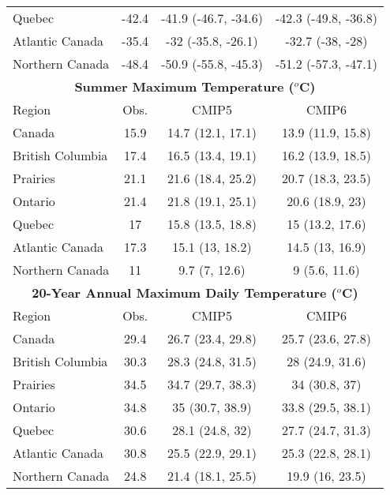 \documentclass[]{scrartcl}
\begin{document}
\begin{table}[t]
\begin{center}
\begin{tabular}{|l|ccc|}
			Quebec & -42.4 & -41.9 (-46.7, -34.6) & -42.3 (-49.8, -36.8) \\ 
			Atlantic Canada & -35.4 & -32 (-35.8, -26.1) & -32.7 (-38, -28) \\ 
			Northern Canada & -48.4 & -50.9 (-55.8, -45.3) & -51.2 (-57.3, -47.1) \\ 			
			\hline	
			\multicolumn{4}{|c|}{\textbf{Summer Maximum Temperature ($^o$C)}} \\
			\hline
			Region & Obs. & CMIP5 & CMIP6   \\
			\hline
			Canada & 15.9 & 14.7 (12.1, 17.1) & 13.9 (11.9, 15.8) \\ 
			British Columbia & 17.4 & 16.5 (13.4, 19.1) & 16.2 (13.9, 18.5) \\ 
			Prairies & 21.1 & 21.6 (18.4, 25.2) & 20.7 (18.3, 23.5) \\ 
			Ontario & 21.4 & 21.8 (19.1, 25.1) & 20.6 (18.9, 23) \\ 
			Quebec & 17 & 15.8 (13.5, 18.8) & 15 (13.2, 17.6) \\ 
			Atlantic Canada & 17.3 & 15.1 (13, 18.2) & 14.5 (13, 16.9) \\ 
			Northern Canada & 11 & 9.7 (7, 12.6) & 9 (5.6, 11.6) \\ 	
			\hline	
			\multicolumn{4}{|c|}{\textbf{20-Year Annual Maximum Daily Temperature ($^o$C)}} \\
			\hline
			Region & Obs. & CMIP5 & CMIP6   \\
			\hline
			Canada & 29.4 & 26.7 (23.4, 29.8) & 25.7 (23.6, 27.8) \\ 
			British Columbia & 30.3 & 28.3 (24.8, 31.5) & 28 (24.9, 31.6) \\ 
			Prairies & 34.5 & 34.7 (29.7, 38.3) & 34 (30.8, 37) \\ 
			Ontario & 34.8 & 35 (30.7, 38.9) & 33.8 (29.5, 38.1) \\ 
			Quebec & 30.6 & 28.1 (24.8, 32) & 27.7 (24.7, 31.3) \\ 
			Atlantic Canada & 30.8 & 25.5 (22.9, 29.1) & 25.3 (22.8, 28.1) \\ 
			Northern Canada & 24.8 & 21.4 (18.1, 25.5) & 19.9 (16, 23.5) \\ 

			\hline				
		\end{tabular}
	\end{center}
\end{table}
\end{document}
